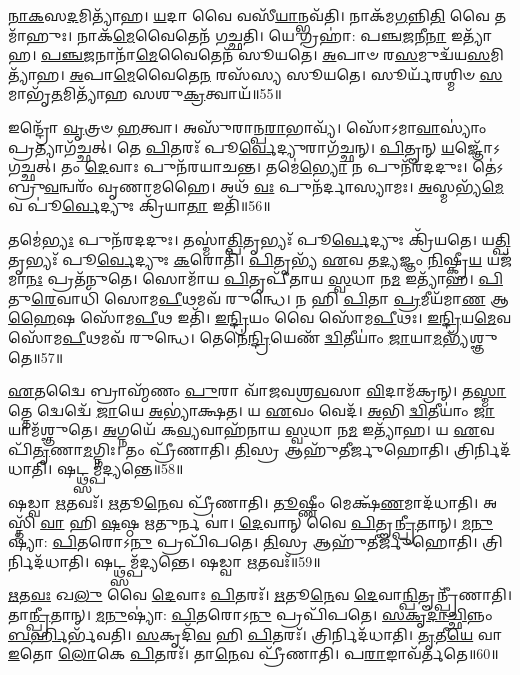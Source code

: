 \-\ul{𑌨𑌾}\-\-\ul{𑌕}\-𑌸\-\ul{𑌦}\-𑌮𑌿𑌤𑍍𑌯𑌾᳴𑌹।
\-\ul{𑌯}\-𑌦𑌾 𑌵𑍈 𑌵𑌸𑍀᳴\-\ul{𑌯𑌾}\-𑌨𑍍𑌭𑌵᳴𑌤𑌿।
𑌨𑌾𑌕᳴𑌮\-\ul{𑌗}\-𑌨𑍍𑌨𑌿\-\ul{𑌤𑌿} 𑌵𑍈 𑌤𑌮𑌾᳴𑌹𑍁𑌃।
𑌨𑌾𑌕᳴\-\ul{𑌮𑍇}\-𑌵𑍈𑌤𑍇𑌨᳴ 𑌗𑌚𑍍𑌛𑌤𑌿।
𑌯𑍇 𑌗𑍍𑌰𑌹𑌾॑: 𑌪𑌞𑍍𑌚\-\ul{𑌜}\-𑌨𑍀\-\ul{𑌨𑌾} 𑌇𑌤𑍍𑌯𑌾᳴𑌹।
\-\ul{𑌪}\-\-\ul{𑌞𑍍𑌚}\-\-\ul{𑌜}\-𑌨𑌾𑌨𑌾᳴\-\ul{𑌮𑍇}\-𑌵𑍈𑌤𑍇𑌨᳴ 𑌸𑍂𑌯𑌤𑍇।
\-\ul{𑌅}\-𑌪𑌾𑍞 𑌰\-\ul{𑌸}\-𑌮𑍁𑌦𑍍𑌵᳴𑌯\-\ul{𑌸}\-𑌮𑌿\-𑌤𑍍𑌯𑌾᳴𑌹।
\-\ul{𑌅}\-𑌪𑌾\-\ul{𑌮𑍇}\-𑌵𑍈𑌤𑍇\-\ul{𑌨} 𑌰𑌸᳴𑌸𑍍𑌯 𑌸𑍂𑌯𑌤𑍇।
𑌸𑍂𑌰𑍍𑌯᳴𑌰𑌶𑍍𑌮𑌿𑍞 \ul{𑌸}\-𑌮𑌾𑌭𑍃᳴\-\ul{𑌤}\-𑌮𑌿𑌤𑍍𑌯𑌾᳴𑌹 𑌸𑌶𑍁\-\ul{𑌕𑍍𑌰}\-𑌤𑍍𑌵𑌾𑌯᳴॥55॥\anuvakamend[\-\ul{𑌗}\-\-\ul{𑌚𑍍𑌛}\-\-\ul{𑌤𑌿} \ul{𑌸𑍂}\-𑌯\-\ul{𑌤𑍇} 𑌨𑌵᳴ 𑌚]

𑌇𑌨𑍍𑌦𑍍𑌰𑍋᳴ \ul{𑌵𑍃}\-𑌤𑍍𑌰𑍞 \ul{𑌹}\-𑌤𑍍𑌵𑌾।
𑌅𑌸𑍁᳴𑌰𑌾𑌨𑍍𑌪\-\ul{𑌰𑌾}\-𑌭𑌾𑌵𑍍𑌯᳴।
𑌸𑍋᳴𑌽𑌮𑌾\-\ul{𑌵𑌾}\-𑌸𑍍𑌯𑌾𑌂॑ 𑌪𑍍𑌰𑌤𑍍𑌯𑌾𑌗᳴𑌚𑍍𑌛𑌤𑍍।
𑌤𑍇 \ul{𑌪𑌿}\-𑌤𑌰𑌃᳴ 𑌪𑍂\-\ul{𑌰𑍍𑌵𑍇}\-𑌦𑍍𑌯𑍁𑌰𑌾𑌗᳴𑌚𑍍𑌛𑌨𑍍।
\-\ul{𑌪𑌿}\-𑌤𑍄𑌨𑍍 \ul{𑌯}\-𑌜𑍍𑌞𑍋᳴\-𑌽𑌗𑌚𑍍𑌛𑌤𑍍।
𑌤𑌂 \ul{𑌦𑍇}\-𑌵𑌾𑌃 𑌪𑍁𑌨᳴𑌰𑌯𑌾𑌚𑌨𑍍𑌤।
𑌤𑌮𑍇॑\-\ul{𑌭𑍍𑌯𑍋} 𑌨 𑌪𑍁𑌨᳴𑌰𑌦𑌦𑍁𑌃।
𑌤𑍇॑𑌽𑌬𑍍𑌰𑍁\-\ul{𑌵}\-𑌨𑍍𑌵𑌰𑌂᳴ 𑌵𑍃𑌣𑌾𑌮𑌹𑍈।
𑌅𑌥᳴ \ul{𑌵𑌃} 𑌪𑍁𑌨᳴𑌰𑍍𑌦𑌾𑌸𑍍𑌯𑌾𑌮𑌃।
\-\ul{𑌅}\-𑌸𑍍𑌮𑌭𑍍𑌯᳴\-\ul{𑌮𑍇}\-𑌵 𑌪𑍂॑\-\ul{𑌰𑍍𑌵𑍇}\-𑌦𑍍𑌯𑍁𑌃 𑌕𑍍𑌰𑌿᳴𑌯𑌾\-\ul{𑌤𑌾} 𑌇𑌤𑌿᳴॥56॥

𑌤𑌮𑍇॑\-\ul{𑌭𑍍𑌯𑌃} 𑌪𑍁𑌨᳴𑌰𑌦𑌦𑍁𑌃।
𑌤𑌸𑍍𑌮𑌾॑\-\ul{𑌤𑍍𑌪𑌿}\-𑌤𑍃𑌭𑍍𑌯𑌃᳴ 𑌪𑍂\-\ul{𑌰𑍍𑌵𑍇}\-𑌦𑍍𑌯𑍁𑌃 𑌕𑍍𑌰𑌿᳴𑌯𑌤𑍇।
𑌯\-\ul{𑌤𑍍𑌪𑌿}\-𑌤𑍃𑌭𑍍𑌯𑌃᳴ 𑌪𑍂\-\ul{𑌰𑍍𑌵𑍇}\-𑌦𑍍𑌯𑍁𑌃 \ul{𑌕}\-𑌰𑍋𑌤𑌿᳴।
\-\ul{𑌪𑌿}\-𑌤𑍃𑌭𑍍𑌯᳴ \ul{𑌏}\-𑌵 𑌤\-\ul{𑌦𑍍𑌯}\-𑌜𑍍𑌞𑌂 \ul{𑌨𑌿}\-𑌷𑍍𑌕𑍍𑌰𑍀\-\ul{𑌯} 𑌯𑌜᳴𑌮𑌾\-\ul{𑌨𑌃} 𑌪𑍍𑌰𑌤᳴𑌨𑍁𑌤𑍇।
𑌸𑍋𑌮𑌾᳴𑌯 \ul{𑌪𑌿}\-𑌤𑍃𑌪𑍀᳴𑌤𑌾𑌯 \ul{𑌸𑍍𑌵}\-𑌧𑌾 𑌨\-\ul{𑌮} 𑌇𑌤𑍍𑌯𑌾᳴𑌹।
\-\ul{𑌪𑌿}\-𑌤𑍁\-\ul{𑌰𑍇}\-𑌵𑌾𑌧𑌿᳴ 𑌸𑍋𑌮\-\ul{𑌪𑍀}\-𑌥𑌮𑌵᳴ 𑌰𑍁𑌨𑍍𑌧𑍇।
𑌨 𑌹𑌿 \ul{𑌪𑌿}\-𑌤𑌾 \ul{𑌪𑍍𑌰}\-𑌮𑍀𑌯᳴𑌮𑌾\-\ul{𑌣} 𑌆\-\ul{𑌹𑍈}\-𑌷 𑌸𑍋᳴𑌮\-\ul{𑌪𑍀}\-𑌥 𑌇𑌤𑌿᳴।
\-\ul{𑌇}\-\-\ul{𑌨𑍍𑌦𑍍𑌰𑌿}\-𑌯𑌂 𑌵𑍈 𑌸𑍋᳴𑌮\-\ul{𑌪𑍀}\-𑌥𑌃।
\-\ul{𑌇}\-\-\ul{𑌨𑍍𑌦𑍍𑌰𑌿}\-𑌯\-\ul{𑌮𑍇}\-𑌵 𑌸𑍋᳴𑌮\-\ul{𑌪𑍀}\-𑌥𑌮𑌵᳴ 𑌰𑍁𑌨𑍍𑌧𑍇।
𑌤𑍇𑌨𑍇॑\-\ul{𑌨𑍍𑌦𑍍𑌰𑌿}\-𑌯𑍇𑌣᳴ \ul{𑌦𑍍𑌵𑌿}\-𑌤𑍀𑌯𑌾𑌂॑ \ul{𑌜𑌾}\-𑌯𑌾\-\ul{𑌮}\-𑌭𑍍𑌯᳴𑌶𑍍𑌞𑍁𑌤𑍇॥57॥

\-\ul{𑌏}\-𑌤𑌦𑍍𑌵𑍈 𑌬𑍍𑌰𑌾𑌹𑍍𑌮᳴𑌣𑌂 \ul{𑌪𑍁}\-𑌰𑌾 𑌵𑌾᳴𑌜𑌵𑌶𑍍𑌰\-\ul{𑌵}\-𑌸𑌾 \ul{𑌵𑌿}\-𑌦𑌾𑌮᳴𑌕𑍍𑌰𑌨𑍍।
𑌤\-\ul{𑌸𑍍𑌮𑌾}\-𑌤𑍍𑌤𑍇 𑌦𑍍𑌵𑍇𑌦𑍍𑌵𑍇᳴ \ul{𑌜𑌾}\-𑌯𑍇 \ul{𑌅}\-𑌭𑍍𑌯𑌾॑𑌕𑍍𑌷𑌤।
𑌯 \ul{𑌏}\-𑌵𑌂 𑌵𑍇𑌦᳴।
\-\ul{𑌅}\-𑌭𑌿 \ul{𑌦𑍍𑌵𑌿}\-𑌤𑍀𑌯𑌾𑌂॑ \ul{𑌜𑌾}\-𑌯𑌾𑌮᳴𑌶𑍍𑌞𑍁𑌤𑍇।
\-\ul{𑌅}\-𑌗𑍍𑌨𑌯𑍇᳴ 𑌕\-\ul{𑌵𑍍𑌯}\-𑌵𑌾𑌹᳴𑌨𑌾𑌯 \ul{𑌸𑍍𑌵}\-𑌧𑌾 𑌨\-\ul{𑌮} 𑌇𑌤𑍍𑌯𑌾᳴𑌹।
𑌯 \ul{𑌏}\-𑌵 𑌪𑌿᳴\-\ul{𑌤𑍃}\-𑌣𑌾\-\ul{𑌮}\-𑌗𑍍𑌨𑌿𑌃।
𑌤𑌂 𑌪𑍍𑌰𑍀᳴𑌣𑌾𑌤𑌿।
\-\ul{𑌤𑌿}\-𑌸𑍍𑌰 𑌆𑌹𑍁᳴𑌤𑍀𑌰𑍍𑌜𑍁𑌹𑍋𑌤𑌿।
𑌤𑍍𑌰𑌿𑌰𑍍𑌨𑌿𑌦᳴𑌧𑌾𑌤𑌿।
𑌷𑌟𑍍𑌥𑍍𑌸𑌮𑍍𑌪᳴𑌦𑍍𑌯𑌨𑍍𑌤𑍇॥58॥

𑌷𑌡𑍍𑌵𑌾 \ul{𑌋}\-𑌤𑌵𑌃᳴।
\-\ul{𑌋}\-𑌤𑍂\-\ul{𑌨𑍇}\-𑌵 𑌪𑍍𑌰𑍀᳴𑌣𑌾𑌤𑌿।
\-\ul{𑌤𑍂}\-𑌷𑍍𑌣𑍀𑌂 𑌮𑍇𑌕𑍍𑌷᳴\-\ul{𑌣}\-𑌮𑌾𑌦᳴𑌧𑌾𑌤𑌿।
𑌅𑌸𑍍𑌤𑌿᳴ \ul{𑌵𑌾} 𑌹𑌿 \ul{𑌷}\-𑌷𑍍𑌠 \ul{𑌋}\-𑌤𑍁𑌰𑍍𑌨 𑌵𑌾॑।
\-\ul{𑌦𑍇}\-𑌵𑌾𑌨𑍍 𑌵𑍈 \ul{𑌪𑌿}\-𑌤𑍄\-\ul{𑌨𑍍𑌪𑍍𑌰𑍀}\-𑌤𑌾𑌨𑍍।
\-\ul{𑌮}\-\-\ul{𑌨𑍁}\-𑌷𑍍𑌯𑌾॑: \ul{𑌪𑌿}\-𑌤𑌰𑍋𑌽\-\ul{𑌨𑍁} 𑌪𑍍𑌰𑌪𑌿᳴𑌪𑌤𑍇।
\-\ul{𑌤𑌿}\-𑌸𑍍𑌰 𑌆𑌹𑍁᳴𑌤𑍀𑌰𑍍𑌜𑍁𑌹𑍋𑌤𑌿।
𑌤𑍍𑌰𑌿𑌰𑍍𑌨𑌿𑌦᳴𑌧𑌾𑌤𑌿।
𑌷𑌟𑍍𑌥𑍍𑌸𑌮𑍍𑌪᳴𑌦𑍍𑌯𑌨𑍍𑌤𑍇।
𑌷𑌡𑍍𑌵𑌾 \ul{𑌋}\-𑌤𑌵𑌃᳴॥59॥

\-\ul{𑌋}\-𑌤\-\ul{𑌵𑌃} 𑌖\-\ul{𑌲𑍁} 𑌵𑍈 \ul{𑌦𑍇}\-𑌵𑌾𑌃 \ul{𑌪𑌿}\-𑌤𑌰𑌃᳴।
\-\ul{𑌋}\-𑌤𑍂\-\ul{𑌨𑍇}\-𑌵 \ul{𑌦𑍇}\-𑌵𑌾\-\ul{𑌨𑍍𑌪𑌿}\-𑌤𑍄𑌨𑍍𑌪𑍍𑌰𑍀᳴𑌣𑌾𑌤𑌿।
𑌤𑌾\-\ul{𑌨𑍍𑌪𑍍𑌰𑍀}\-𑌤𑌾𑌨𑍍।
\-\ul{𑌮}\-\-\ul{𑌨𑍁}\-𑌷𑍍𑌯𑌾॑: \ul{𑌪𑌿}\-𑌤𑌰𑍋𑌽\-\ul{𑌨𑍁} 𑌪𑍍𑌰𑌪𑌿᳴𑌪𑌤𑍇।
\-\ul{𑌸}\-\-\ul{𑌕𑍃}\-\-\ul{𑌦𑌾}\-\-\ul{𑌚𑍍𑌛𑌿}\-𑌨𑍍𑌨𑌂 \ul{𑌬}\-\-\ul{𑌰𑍍}\-\mbox{}𑌹𑌿𑌰𑍍𑌭᳴𑌵𑌤𑌿।
\-\ul{𑌸}\-𑌕𑍃𑌦𑌿᳴\-\ul{𑌵} 𑌹𑌿 \ul{𑌪𑌿}\-𑌤𑌰𑌃᳴।
𑌤𑍍𑌰𑌿𑌰𑍍𑌨𑌿𑌦᳴𑌧𑌾𑌤𑌿।
\-\ul{𑌤𑍃}\-𑌤𑍀\-\ul{𑌯𑍇} 𑌵𑌾 \ul{𑌇}\-𑌤𑍋 \ul{𑌲𑍋}\-𑌕𑍇 \ul{𑌪𑌿}\-𑌤𑌰𑌃᳴।
𑌤𑌾\-\ul{𑌨𑍇}\-𑌵 𑌪𑍍𑌰𑍀᳴𑌣𑌾𑌤𑌿।
𑌪\-\ul{𑌰𑌾}\-𑌙𑌾𑌵᳴𑌰𑍍𑌤𑌤𑍇॥60॥


